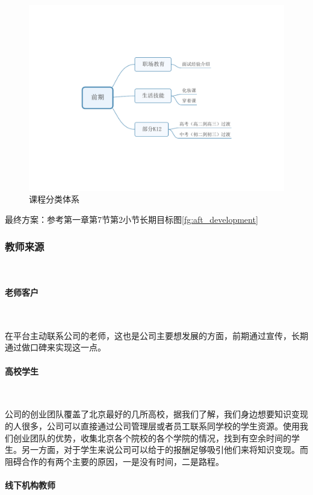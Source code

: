 \begin{figure}[H]
	\centering
	\includegraphics[width=0.9\columnwidth]{figures/prophase_development}
	\caption{课程分类体系}
	\label{fg:prophase_development}
\end{figure}

最终方案：参考第一章第7节第2小节长期目标图\ref{fg:aft_development}

\subsubsection{教师来源}\

\paragraph{老师客户}\

在平台主动联系公司的老师，这也是公司主要想发展的方面，前期通过宣传，长期通过做口碑来实现这一点。

\paragraph{高校学生}\

公司的创业团队覆盖了北京最好的几所高校，据我们了解，我们身边想要知识变现的人很多，公司可以直接通过公司管理层或者员工联系同学校的学生资源。使用我们创业团队的优势，收集北京各个院校的各个学院的情况，找到有空余时间的学生。另一方面，对于学生来说公司可以给于的报酬足够吸引他们来将知识变现。而阻碍合作的有两个主要的原因，一是没有时间，二是路程。

\paragraph{线下机构教师}\

